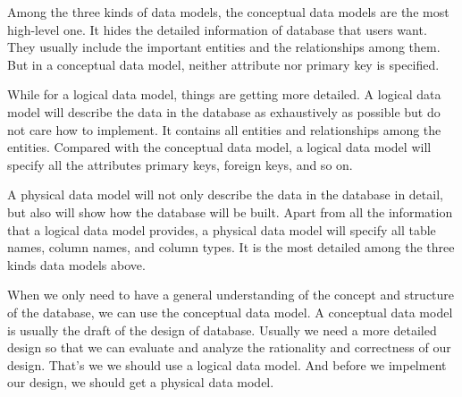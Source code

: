 \documentclass[12pt, a4paper]{article}
\begin{document}
Among the three kinds of data models, the conceptual data models are the most high-level one. It hides the detailed information of database that users want. They usually include the important entities and the relationships among them. But in a conceptual data model, neither attribute nor primary key is specified.

While for a logical data model, things are getting more detailed. A logical data model will describe the data in the database as exhaustively as possible but do not care how to implement. It contains all entities and relationships among the entities. Compared with the conceptual data model, a logical data model will specify all the attributes primary keys, foreign keys, and so on.

A physical data model will not only describe the data in the database in detail, but also will show how the database will be built. Apart from all the information that a logical data model provides, a physical data model will specify all table names, column names, and column types. It is the most detailed among the three kinds data models above.

When we only need to have a general understanding of the concept and structure of the database, we can use the conceptual data model. A conceptual data model is usually the draft of the design of database. Usually we need a more detailed design so that we can evaluate and analyze the rationality and correctness of our design. That's we we should use a logical data model. And before we impelment our design, we should get a physical data model.


\end{document}
